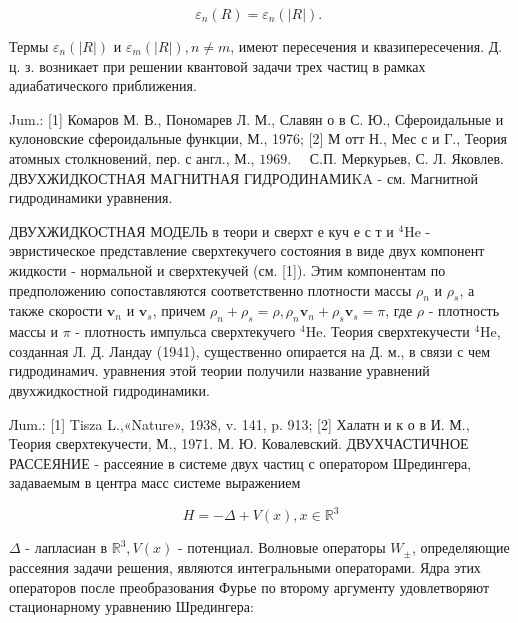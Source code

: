 \documentclass[10pt]{article}
\begin{document}
\[

\varepsilon_{n}(R)=\varepsilon_{n}(|R|) \text {. }

\]



Термы $\varepsilon_{n}(|R|)$ и $\varepsilon_{m}(|R|), n \neq m$, имеют пересечения и квазипересечения. Д. ц. з. возникает при решении квантовой задачи трех частиц в рамках адиабатического приближения.



Jum.: [1] Комаров М. В., Пономарев Л. М., Славян о в С. Ю., Сфероидальные и кулоновские сфероидальные функции, М., 1976; [2] М отт Н., Мес с и Г., Теория атомных столкновений, пер. с англ., М., $1969 . \quad$ С.П. Меркурьев, С. Л. Яковлев. ДВУХЖИДКОСТНАЯ МАГНИТНАЯ ГИДРОДИНАМИKA - см. Магнитной гидродинамики уравнения.



ДВУХЖИДКОСТНАЯ МОДЕЛЬ в теори и сверхт е куч е с т и ${ }^{4} \mathrm{He}$ - эвристическое представление сверхтекучего состояния в виде двух компонент жидкости - нормальной и сверхтекучей (см. [1]). Этим компонентам по предположению сопоставляются соответственно плотности массы $\rho_{n}$ и $\rho_{s}$, а также скорости $\boldsymbol{v}_{n}$ и $\boldsymbol{v}_{s}$, причем $\rho_{n}+\rho_{s}=\rho, \rho_{n} \boldsymbol{v}_{n}+\rho_{s} \boldsymbol{v}_{s}=\pi$, где $\rho$ - плотность массы и $\pi$ - плотность импульса сверхтекучего ${ }^{4} \mathrm{He}$. Теория сверхтекучести ${ }^{4} \mathrm{He}$, созданная Л. Д. Ландау (1941), существенно опирается на Д. м., в связи с чем гидродинамич. уравнения этой теории получили название уравнений двухжидкостной гидродинамики.



Лum.: [1] Tisza L.,«Nature», 1938, v. 141, p. 913; [2] Халатн и к о в И. М., Теория сверхтекучести, М., 1971. М. Ю. Ковалевский. ДВУХЧАСТИЧНОЕ РАССЕЯНИЕ - рассеяние в системе двух частиц с оператором Шредингера, задаваемым в центра масс системе выражением



\[

H=-\Delta+V(x), x \in \mathbb{R}^{3}

\]



$\Delta$ - лапласиан в $\mathbb{R}^{3}, V(x)$ - потенциал. Волновые операторы $W_{ \pm}$, определяющие рассеяния задачи решения, являются интегральными операторами. Ядра этих операторов после преобразования Фурье по второму аргументу удовлетворяют стационарному уравнению Шредингера:
\end{document}
